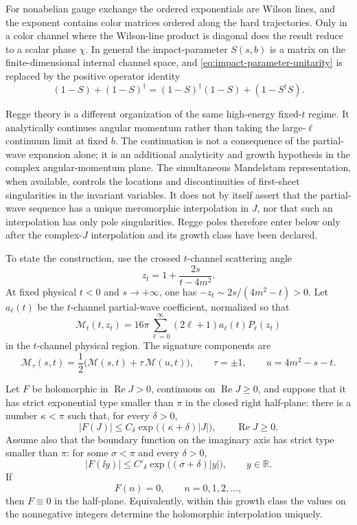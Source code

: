 For nonabelian gauge exchange the ordered exponentials are Wilson lines, and
the exponent contains color matrices ordered along the hard trajectories.
Only in a color channel where the Wilson-line product is diagonal does the
result reduce to a scalar phase \(\chi\).  In general the impact-parameter
\(S(s,b)\) is a matrix on the finite-dimensional internal channel space, and
\eqref{eq:impact-parameter-unitarity} is replaced by the positive operator
identity
\[
  (1-S)+(1-S)^\dagger
  =
  (1-S)^\dagger(1-S)+(1-S^\dagger S).
\]

Regge theory is a different organization of the same high-energy fixed-\(t\)
regime.  It analytically continues angular momentum rather than taking the
large-\(\ell\) continuum limit at fixed \(b\).  The continuation is not a
consequence of the partial-wave expansion alone; it is an additional
analyticity and growth hypothesis in the complex angular-momentum plane.
The simultaneous Mandelstam representation, when available, controls the
locations and discontinuities of first-sheet singularities in the invariant
variables.  It does not by itself assert that the partial-wave sequence has a
unique meromorphic interpolation in \(J\), nor that such an interpolation has
only pole singularities.  Regge poles therefore enter below only after the
complex-\(J\) interpolation and its growth class have been declared.

To state the construction, use the crossed \(t\)-channel scattering angle
\[
  z_t=1+\frac{2s}{t-4m^2}.
\]
At fixed physical \(t<0\) and \(s\to+\infty\), one has
\(-z_t\sim 2s/(4m^2-t)>0\).  Let \(a_\ell(t)\) be the \(t\)-channel
partial-wave coefficient, normalized so that
\[
  \mathcal M_t(t,z_t)
  =
  16\pi\sum_{\ell=0}^{\infty}(2\ell+1)a_\ell(t)P_\ell(z_t)
\]
in the \(t\)-channel physical region.  The signature components are
\[
  \mathcal M_\tau(s,t)
  =
  \frac{1}{2}\bigl(\mathcal M(s,t)+\tau\,\mathcal M(u,t)\bigr),
  \qquad
  \tau=\pm1,\qquad u=4m^2-s-t .
\]

\begin{theorem}
\label{thm:carlson-half-plane-uniqueness}
Let \(F\) be holomorphic in \(\operatorname{Re}J>0\), continuous on
\(\operatorname{Re}J\ge0\), and suppose that it has strict exponential type
smaller than \(\pi\) in the closed right half-plane: there is a number
\(\kappa<\pi\) such that, for every \(\delta>0\),
\[
  |F(J)|\le C_\delta
  \exp\bigl((\kappa+\delta)|J|\bigr),
  \qquad \operatorname{Re}J\ge0 .
\]
Assume also that the boundary function on the imaginary axis has strict type
smaller than \(\pi\): for some \(\sigma<\pi\) and every \(\delta>0\),
\[
  |F(\ii y)|\le C'_\delta
  \exp\bigl((\sigma+\delta)|y|\bigr),
  \qquad y\in\mathbb R .
\]
If
\[
  F(n)=0,\qquad n=0,1,2,\ldots ,
\]
then \(F\equiv0\) in the half-plane.  Equivalently, within this growth class
the values on the nonnegative integers determine the holomorphic
interpolation uniquely.
\end{theorem}


